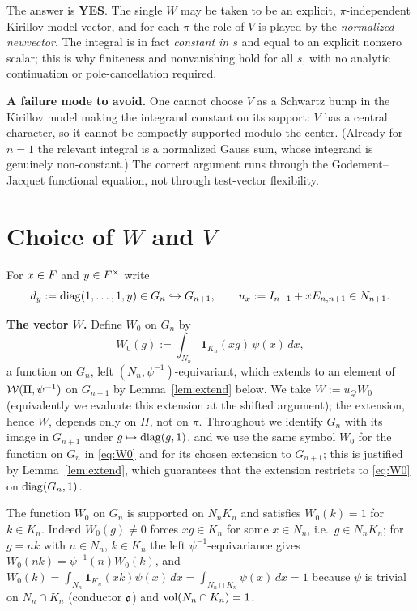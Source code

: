 \medskip
\noindent The answer is \textbf{YES}. The single $W$ may be taken to be an
explicit, $\pi$-independent Kirillov-model vector, and for each $\pi$
the role of $V$ is played by the \emph{normalized newvector}. The integral is in
fact \emph{constant in $s$} and equal to an explicit nonzero scalar; this is why
finiteness and nonvanishing hold for all $s$, with no analytic continuation or
pole-cancellation required.

\medskip
\noindent\textbf{A failure mode to avoid.} One cannot choose $V$ as a
Schwartz bump in the Kirillov model making the integrand constant on its
support: $V$ has a central character, so it cannot be compactly supported modulo
the center. (Already for $n=1$ the relevant integral is a normalized Gauss sum,
whose integrand is genuinely non-constant.) The correct argument runs through the
Godement--Jacquet functional equation, not through test-vector flexibility.

\section*{Choice of $W$ and $V$}

For $x\in F$ and $y\in F^\times$ write
\[
d_y:=\operatorname{diag}(1,\dots,1,y)\in G_n\hookrightarrow G_{n+1},\qquad
u_x:=I_{n+1}+xE_{n,n+1}\in N_{n+1}.
\]

\noindent\textbf{The vector $W$.} Define $W_0$ on $G_n$ by
\begin{equation}\label{eq:W0}
W_0(g):=\int_{N_n}\mathbf 1_{K_n}(xg)\,\psi(x)\,dx,
\end{equation}
a function on $G_n$, left $(N_n,\psi^{-1})$-equivariant, which extends to an element of
$\mathcal{W}(\Pi,\psi^{-1})$ on $G_{n+1}$ by Lemma~\ref{lem:extend} below. We take
$W:=u_Q W_0$ (equivalently we evaluate this extension at the shifted argument); the
extension, hence $W$, depends only on $\Pi$, not on $\pi$. Throughout we identify $G_n$
with its image in $G_{n+1}$ under $g\mapsto\operatorname{diag}(g,1)$, and we use the same symbol
$W_0$ for the function on $G_n$ in \eqref{eq:W0} and for its chosen extension to
$G_{n+1}$; this is justified by Lemma~\ref{lem:extend}, which guarantees that the
extension restricts to \eqref{eq:W0} on $\operatorname{diag}(G_n,1)$.

The function $W_0$ on $G_n$ is supported on $N_nK_n$ and satisfies $W_0(k)=1$ for
$k\in K_n$. Indeed $W_0(g)\neq0$ forces $xg\in K_n$ for some $x\in N_n$, i.e.\
$g\in N_nK_n$; for $g=nk$ with $n\in N_n$, $k\in K_n$ the left $\psi^{-1}$-equivariance
gives $W_0(nk)=\psi^{-1}(n)W_0(k)$, and $W_0(k)=\int_{N_n}\mathbf 1_{K_n}(xk)\psi(x)\,dx
=\int_{N_n\cap K_n}\psi(x)\,dx=1$ because $\psi$ is trivial on $N_n\cap K_n$ (conductor
$\mathfrak{o}$) and $\operatorname{vol}(N_n\cap K_n)=1$.


